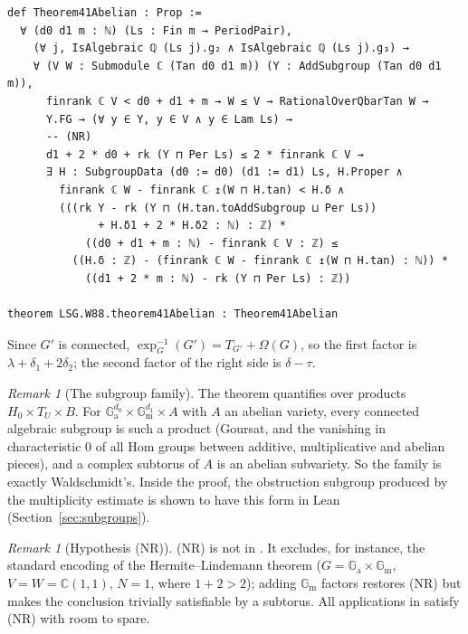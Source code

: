 \documentclass[11pt]{amsart}
\theoremstyle{definition}
\theoremstyle{remark}
\newtheorem{remark}[theorem]{Remark}
\numberwithin{equation}{section}
\newcommand{\CC}{\mathbb{C}}
\newcommand{\Ga}{\mathbb{G}_{\mathrm{a}}}
\newcommand{\Gm}{\mathbb{G}_{\mathrm{m}}}
\newcommand{\NR}{\textup{(NR)}}
\begin{document}
\begin{Verbatim}[fontsize=\scriptsize]
def Theorem41Abelian : Prop :=
  ∀ (d0 d1 m : ℕ) (Ls : Fin m → PeriodPair),
    (∀ j, IsAlgebraic ℚ (Ls j).g₂ ∧ IsAlgebraic ℚ (Ls j).g₃) →
    ∀ (V W : Submodule ℂ (Tan d0 d1 m)) (Y : AddSubgroup (Tan d0 d1 m)),
      finrank ℂ V < d0 + d1 + m → W ≤ V → RationalOverQbarTan W →
      Y.FG → (∀ y ∈ Y, y ∈ V ∧ y ∈ Lam Ls) →
      -- (NR)
      d1 + 2 * d0 + rk (Y ⊓ Per Ls) ≤ 2 * finrank ℂ V →
      ∃ H : SubgroupData (d0 := d0) (d1 := d1) Ls, H.Proper ∧
        finrank ℂ W - finrank ℂ ↥(W ⊓ H.tan) < H.δ ∧
        (((rk Y - rk (Y ⊓ (H.tan.toAddSubgroup ⊔ Per Ls))
              + H.δ1 + 2 * H.δ2 : ℕ) : ℤ) *
            ((d0 + d1 + m : ℕ) - finrank ℂ V : ℤ) ≤
          ((H.δ : ℤ) - (finrank ℂ W - finrank ℂ ↥(W ⊓ H.tan) : ℕ)) *
            ((d1 + 2 * m : ℕ) - rk (Y ⊓ Per Ls) : ℤ))

theorem LSG.W88.theorem41Abelian : Theorem41Abelian
\end{Verbatim}

Since $G'$ is connected, $\exp_G^{-1}(G')=T_{G'}+\Omega(G)$, so the first factor is $\lambda+\delta_1+2\delta_2$;
the second factor of the right side is $\delta-\tau$.

\begin{remark}[The subgroup family]
The theorem quantifies over products $H_0\times T_U\times B$. For
$\Ga^{d_0}\times\Gm^{d_1}\times A$ with $A$ an abelian variety, every connected algebraic subgroup is
such a product (Goursat, and the vanishing in characteristic $0$ of all Hom groups between additive,
multiplicative and abelian pieces), and a complex subtorus of $A$ is an abelian subvariety. So the
family is exactly Waldschmidt's. Inside the proof, the obstruction subgroup produced by the
multiplicity estimate is shown to have this form in Lean (Section~\ref{sec:subgroups}).
\end{remark}

\begin{remark}[Hypothesis \NR]\label{rem:NR}
\NR{} is not in \cite{W88}. It excludes, for instance, the standard encoding of the
Hermite--Lindemann theorem ($G=\Ga\times\Gm$, $V=W=\CC(1,1)$, $N=1$, where $1+2>2$); adding $\Gm$
factors restores \NR{} but makes the conclusion trivially satisfiable by a subtorus. All applications
in \cite{Note} satisfy \NR{} with room to spare.
\end{remark}
\end{document}
